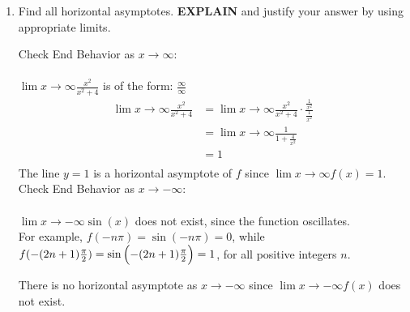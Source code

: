 \documentclass{ximera}
\begin{document}
\begin{problem}
\begin{enumerate}
      \item Find all horizontal asymptotes. \textbf{EXPLAIN} and justify your answer by using appropriate limits.
        \begin{explanation}
        Check End Behavior as $x \to \infty$:\\\\
        $\displaystyle \lim{x \to \infty}\frac{x^{2}}{x^{2}+4}$ is of the form: $\frac{\infty}{\infty}$
        \begin{align*}
                   \displaystyle \lim{x \to \infty} \frac{x^{2}}{x^{2}+4}
          &= \displaystyle \lim{x \to \infty} \frac{x^{2}}{x^{2}+4} \cdot \frac{\frac{1}{x^{2}}}{\frac{1}{x^{2}}} \\
          &= \displaystyle \lim{x \to \infty}  \frac{1}{1+\frac{4}{x^{2}}}\\
          &= 1 \\
        \end{align*}
        The line $y = 1$ is a horizontal asymptote of $f$ since $\displaystyle \lim{x \to \infty} f(x) = 1$.\\[2em]

        Check End Behavior as $x \to -\infty$:\\\\
        $\displaystyle \lim{x \to -\infty}\sin(x)$  does not exist, since the function oscillates.\\[1em]
        For example, $f(-n\pi)=\sin{(-n\pi)}=0$, while $f(-(2n+1)\frac{\pi}{2})=\sin{\Bigl(-(2n+1)\frac{\pi}{2}\Bigr)}=1$, for all positive integers $n$. 
       
        There is no  horizontal asymptote as $x \to -\infty$ since $\displaystyle \lim{x \to -\infty} f(x)$ does not exist.\\[1em]
	
      \end{explanation}

\end{enumerate}
    
\end{problem}
\end{document}
